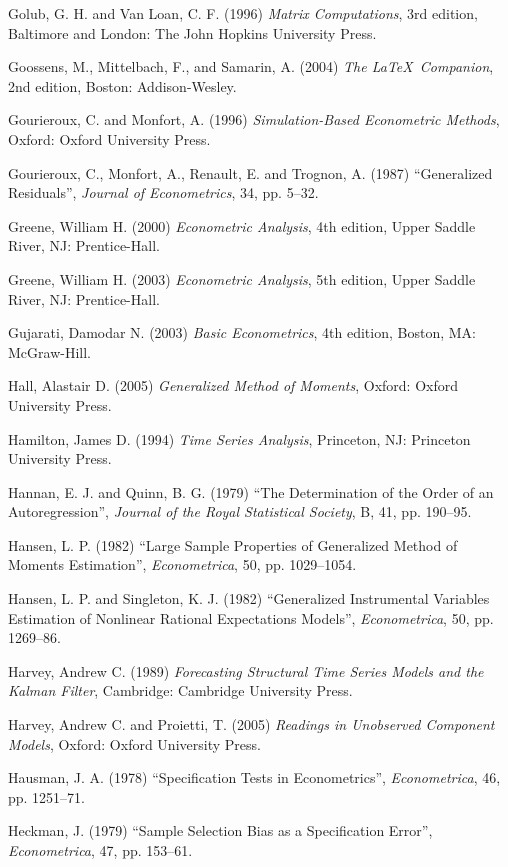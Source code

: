 \begin{thebibliography}
  Golub, G. H. and Van Loan, C. F. (1996) \emph{Matrix Computations},
  3rd edition, Baltimore and London: The John Hopkins University
  Press.

  Goossens, M., Mittelbach, F., and Samarin, A. (2004) \emph{The
    \LaTeX\ Companion}, 2nd edition, Boston: Addison-Wesley.

  Gourieroux, C. and Monfort, A. (1996) \emph{Simulation-Based
    Econometric Methods}, Oxford: Oxford University Press.

  Gourieroux, C., Monfort, A., Renault, E. and Trognon, A. (1987)
  ``Generalized Residuals'', \emph{Journal of Econometrics}, 34,
  pp. 5--32.  

  Greene, William H. (2000) \emph{Econometric Analysis}, 4th edition,
  Upper Saddle River, NJ: Prentice-Hall.

  Greene, William H. (2003) \emph{Econometric Analysis}, 5th edition,
  Upper Saddle River, NJ: Prentice-Hall.

  Gujarati, Damodar N. (2003) \emph{Basic Econometrics}, 4th edition,
  Boston, MA: McGraw-Hill.

  Hall, Alastair D. (2005) \emph{Generalized Method of Moments},
  Oxford: Oxford University Press.

  Hamilton, James D. (1994) \emph{Time Series Analysis}, Princeton,
  NJ: Princeton University Press.

  Hannan, E. J. and Quinn, B. G. (1979) ``The Determination of the
    Order of an Autoregression'', \emph{Journal of the Royal
    Statistical Society}, B, 41, pp. 190--95.

  Hansen, L. P. (1982) ``Large Sample Properties of Generalized Method
  of Moments Estimation'', \emph{Econometrica}, 50, pp. 1029--1054.

  Hansen, L. P. and Singleton, K. J. (1982) ``Generalized
  Instrumental Variables Estimation of Nonlinear Rational Expectations
  Models'', \emph{Econometrica}, 50, pp. 1269--86. 

  Harvey, Andrew C. (1989) \emph{Forecasting Structural Time Series
    Models and the Kalman Filter}, Cambridge: Cambridge University
  Press.

  Harvey, Andrew C. and Proietti, T. (2005) \emph{Readings in
    Unobserved Component Models}, Oxford: Oxford University Press.

  Hausman, J. A. (1978) ``Specification Tests in Econometrics'',
  \emph{Econometrica}, 46, pp. 1251--71.

  Heckman, J. (1979) ``Sample Selection Bias as a Specification Error'',
  \emph{Econometrica}, 47, pp. 153--61.


\end{thebibliography}

